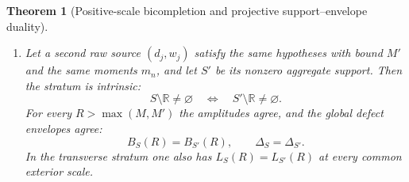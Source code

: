 \documentclass[11pt]{article}
\newtheorem{theorem}{Theorem}[section]
\theoremstyle{remark}
\newcommand{\R}{\mathbb R}
\begin{document}
\begin{theorem}[Positive-scale bicompletion and projective support--envelope duality]
\begin{enumerate}
The same projective coordinates linearize the bounded maximal hull.  If
$D\subset(M,\infty)$ and $d:D\to[0,\infty)$, then
\begin{equation}
 \mathcal H_D(R\mapsto R+d(R))\cap\{(x,a):a\le M\}
 =\left\{q\in\mathcal C:
   \begin{array}{l}
   q_2\le M,\\[-2pt]
   \ell_{\lambda_R(d(R))}(q)\le d(R)\quad(R\in D)
   \end{array}\right\}.
 \tag{2.19e}
\end{equation}
Furthermore $h_S(0)=\Delta_S$.  In the transverse case $\Delta_S>0$, the complete exterior
defect graph is exactly
\begin{equation}
 \{(R,D_S(R)):R>M\}
 =\{(\rho_S(\lambda),h_S(\lambda)):
      0<\lambda<1,\ \rho_S(\lambda)>M\}.
 \tag{2.19f}
\end{equation}
The map $\rho_S$ is one-to-one on the displayed admissible projective domain, and the inverse
coordinate is
\begin{equation}
 \lambda=\frac{D_S(R)}{2R+D_S(R)}.
 \tag{2.19g}
\end{equation}
In the complementary radical case $\Delta_S=0$, the graph is simply
$\{(R,0):R>M\}$.

Finally, these conclusions are dimension-free.  If $E$ is a real Hilbert space, $e\in E$ is a
unit vector, and $z\mapsto(\langle z,e\rangle,\|z\|)$ is the axial Lorentz lift, then
\[
 g_R(\langle z,e\rangle,\|z\|)=\|z\|+\|R e-z\|,
\]
and the fixed-point, contraction, stability, radical, and projective-hull laws apply verbatim.

\item Let a second raw source $(d_j,w_j)$ satisfy the same hypotheses with bound $M'$ and the
same moments $m_n$, and let $S'$ be its nonzero aggregate support.  Then the stratum is intrinsic:
\begin{equation}
 S\setminus\R\ne\varnothing
 \quad\Longleftrightarrow\quad
 S'\setminus\R\ne\varnothing.
 \tag{2.20}
\end{equation}
For every $R>\max(M,M')$ the amplitudes agree, and the global defect envelopes agree:
\begin{equation}
 B_S(R)=B_{S'}(R),\qquad \Delta_S=\Delta_{S'}.
 \tag{2.21}
\end{equation}
In the transverse stratum one also has $L_S(R)=L_{S'}(R)$ at every common exterior scale.


\end{enumerate}
\end{theorem}
\end{document}
